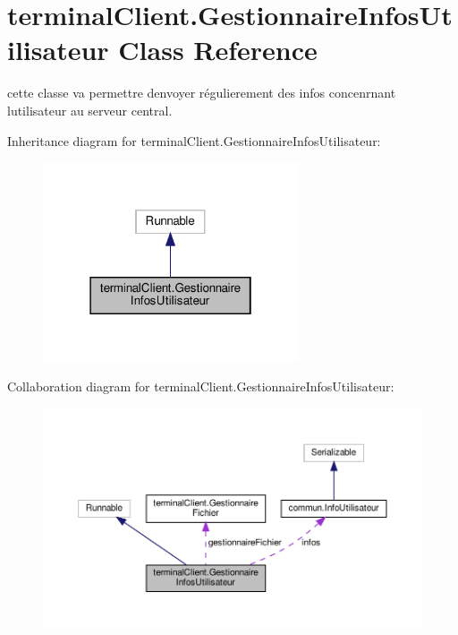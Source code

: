 \hypertarget{classterminalClient_1_1GestionnaireInfosUtilisateur}{}\section{terminal\+Client.\+Gestionnaire\+Infos\+Utilisateur Class Reference}
\label{classterminalClient_1_1GestionnaireInfosUtilisateur}


cette classe va permettre d\textquotesingle{}envoyer régulierement des infos concenrnant l\textquotesingle{}utilisateur au serveur central.  




Inheritance diagram for terminal\+Client.\+Gestionnaire\+Infos\+Utilisateur\+:\nopagebreak
\begin{figure}[H]
\begin{center}
\leavevmode
\includegraphics[width=214pt]{classterminalClient_1_1GestionnaireInfosUtilisateur__inherit__graph}
\end{center}
\end{figure}


Collaboration diagram for terminal\+Client.\+Gestionnaire\+Infos\+Utilisateur\+:\nopagebreak
\begin{figure}[H]
\begin{center}
\leavevmode
\includegraphics[width=350pt]{classterminalClient_1_1GestionnaireInfosUtilisateur__coll__graph}
\end{center}
\end{figure}
